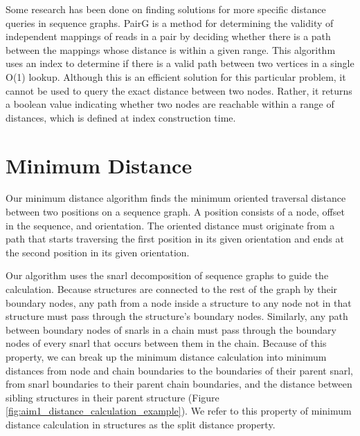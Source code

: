 \documentclass[11pt]{ucscthesis}
\begin{document}
Some research has been done on finding solutions for more specific distance queries in sequence graphs.
PairG \cite{jain_validating_2019} is a method for determining the validity of independent mappings of reads in a pair by deciding whether there is a path between the mappings whose distance is within a given range.
This algorithm uses an index to determine if there is a valid path between two vertices in a single O(1) lookup.
Although this is an efficient solution for this particular problem, it cannot be used to query the exact distance between two nodes.
Rather, it returns a boolean value indicating whether two nodes are reachable within a range of distances, which is defined at index construction time.

\section {Minimum Distance}

Our minimum distance algorithm finds the minimum oriented traversal distance between two positions on a sequence graph. 
A position consists of a node, offset in the sequence, and orientation.
The oriented distance must originate from a path that starts traversing the first position in its given orientation and ends at the second position in its given orientation.


Our algorithm uses the snarl decomposition of sequence graphs to guide the calculation.
Because structures are connected to the rest of the graph by their boundary nodes, any path from a node inside a structure to any node not in that structure must pass through the structure's boundary nodes.
Similarly, any path between boundary nodes of snarls in a chain must pass through the boundary nodes of every snarl that occurs between them in the chain.
Because of this property, we can break up the minimum distance calculation into minimum distances from node and chain boundaries to the boundaries of their parent snarl, from snarl boundaries to their parent chain boundaries, and the distance between sibling structures in their parent structure (Figure \ref{fig:aim1_distance_calculation_example}).
We refer to this property of minimum distance calculation in structures as the split distance property.
\end{document}
